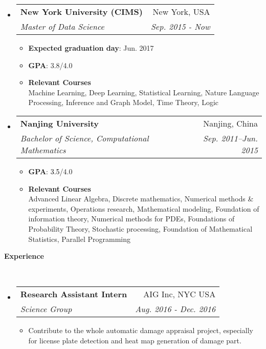 \documentclass[a4paper,11pt]{article}
\makeatletter
\newcommand{\resitem}[1]{\item #1 \vspace{-2pt}}
\renewcommand{\normalsize}{\fontsize{12pt}{\baselineskip}\selectfont}
\newcommand{\resheading}[1]{{\large \colorbox{mygrey}{\begin{minipage}{\textwidth}{\textbf{#1 \vphantom{p\^{E}}}}\end{minipage}}}}
\newcommand{\ressubheading}[4]{
	\begin{tabular*}{6.5in}{l@{\extracolsep{\fill}}r}
		\textbf{#1} & #2 \\
		\textit{#3} & \textit{#4} \\
	\end{tabular*}\vspace{-6pt}}
\makeatother
\begin{document}
	\begin{itemize}
		\item
		\ressubheading{{\normalsize New York University (CIMS) }}{New York, USA}{\normalsize Master of Data Science}{Sep. 2015 - Now}
		\begin{itemize}
			\item {\bfseries Expected graduation day}: Jun. 2017
			\item {\bfseries GPA}: 3.8/4.0
			\item {\bfseries Relevant Courses}\\
			{\footnotesize
				Machine Learning, Deep Learning, Statistical Learning, Nature Language Processing, Inference and Graph Model, Time Theory, Logic
			}
		\end{itemize}
		\item
		\ressubheading{{\normalsize Nanjing University}}{Nanjing, China}{{\normalsize Bachelor of Science, Computational Mathematics}}{Sep. 2011--Jun. 2015}
		\begin{itemize}
			\item {\bfseries GPA}: \textcolor{black}{3.5}/4.0
			\item {\bfseries Relevant Courses}\\
			{ \footnotesize
				Advanced Linear Algebra, Discrete mathematics, Numerical methods \& experiments, Operations research, Mathematical modeling, Foundation of information theory, Numerical methods for PDEs, Foundations of Probability Theory, Stochastic processing, Foundation of Mathematical Statistics, Parallel Programming
			}
		\end{itemize}
	\end{itemize}
	
	
	\resheading{Experience}\\
	\begin{itemize}
		\item \ressubheading{\normalsize Research Assistant Intern}{AIG Inc, NYC USA}{\normalsize Science Group}{Aug. 2016 - Dec. 2016}
		\begin{itemize}
			\resitem{Contribute to the whole automatic damage appraisal project, especially for license plate detection and heat map generation of damage part.}
		\end{itemize}
	\end{itemize}
	
\end{document}
